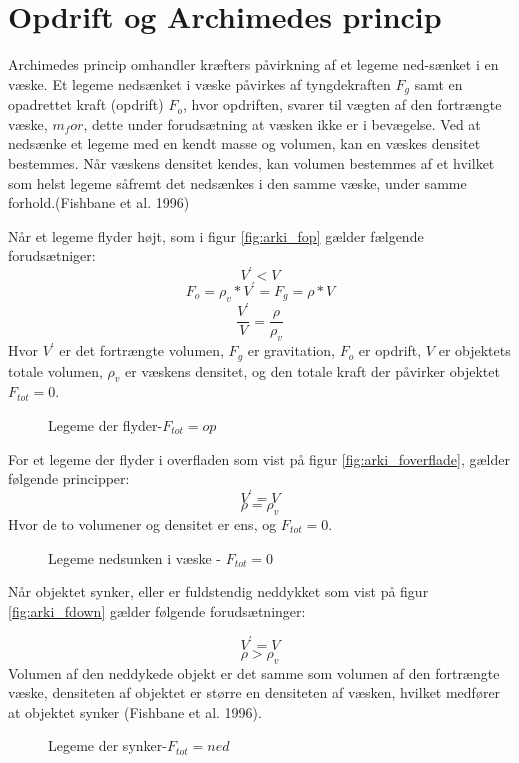 \section{Opdrift og Archimedes princip}
Archimedes princip omhandler kræfters påvirkning af et legeme ned-sænket i en væske. Et legeme nedsænket i væske påvirkes af tyngdekraften $F_g$ samt en opadrettet kraft (opdrift) $F_o$, hvor opdriften, svarer til vægten af den fortrængte væske, $m_for$, dette under forudsætning at væsken ikke er i bevægelse. 
Ved at nedsænke et legeme med en kendt masse og volumen, kan en væskes densitet bestemmes. Når væskens densitet kendes, kan volumen bestemmes af et hvilket som helst legeme såfremt det nedsænkes i den samme væske, under samme forhold.(Fishbane et al. 1996) 

Når et legeme flyder højt, som i figur \vref{fig:arki_fop} gælder fælgende forudsætniger: 
%
\begin{equation} 
 V^\prime< V
\end{equation}
% 
% 
\begin{equation} 
 F_o=\rho_v*V^\prime=F_g=\rho*V
\end{equation}
% 
% 
\begin{equation} 
 \frac{V^\prime}{V}=\frac{\rho}{\rho_v}
\end{equation}
% 
Hvor $V^\prime$ er det fortrængte volumen, $F_g$ er gravitation, $F_o$ er opdrift, $V$ er objektets totale volumen, $\rho_v$ er væskens densitet, og den totale kraft der påvirker objektet $F_{tot}=0$. 
%
\begin{figure}
\centering

\caption{Legeme der flyder-$F_{tot}=op$}
\label{fig:arki_fop}
\end{figure}
%
For et legeme der flyder i overfladen som vist på figur \vref{fig:arki_foverflade}, gælder følgende principper:
% 
\begin{equation}
V^\prime=V
\end{equation}
%
% 
\begin{equation}
\rho=\rho_v
\end{equation}
% 
Hvor de to volumener og densitet er ens, og $F_{tot}=0$.
% 
% 
\begin{figure}
\centering

\caption{Legeme nedsunken i væske - $F_{tot}=0$}
\label{fig:arki_foverflade}
\end{figure}
%
% 
Når objektet synker, eller er fuldstendig neddykket som vist på figur \vref{fig:arki_fdown} gælder følgende forudsætninger:

% 
\begin{equation}
V^\prime=V
\end{equation}
% 
% 
\begin{equation}
\rho>\rho_v
\end{equation}
% 
Volumen af den neddykede objekt er det samme som volumen af den fortrængte væske, densiteten af objektet er større en densiteten af væsken, hvilket medfører at objektet synker (Fishbane et al. 1996). 
%
\begin{figure}
\centering

\caption{Legeme der synker-$F_{tot}=ned$}
\label{fig:arki_fdown}
\end{figure}
%
